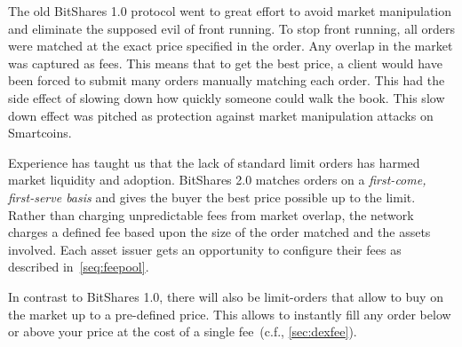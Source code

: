 The old BitShares 1.0 protocol went to great effort to avoid market
manipulation and eliminate the supposed evil of front running. To stop front
running, all orders were matched at the exact price specified in the order. Any
overlap in the market was captured as fees. This means that to get the best
price, a client would have been forced to submit many orders manually matching
each order. This had the side effect of slowing down how quickly someone could
walk the book. This slow down effect was pitched as protection against market
manipulation attacks on Smartcoins.

Experience has taught us that the lack of standard limit orders has harmed
market liquidity and adoption. BitShares 2.0 matches orders on a
\emph{first-come, first-serve basis} and gives the buyer the best price
possible up to the limit. Rather than charging unpredictable fees from market
overlap, the network charges a defined fee based upon the size of the order
matched and the assets involved. Each asset issuer gets an opportunity to
configure their fees as described in~\cref{seq:feepool}.

In contrast to BitShares 1.0, there will also be limit-orders that allow to buy
on the market up to a pre-defined price. This allows to instantly fill any
order below or above your price at the cost of a single fee~(c.f.,
\cref{sec:dexfee}).
